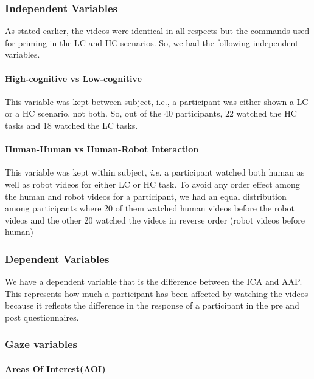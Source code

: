 \documentclass{acm_proc_article-sp}
\begin{document}
\subsubsection{Independent Variables}

As stated earlier, the videos were identical in all respects but the commands
used for priming in the LC and HC scenarios. So, we had the following
independent variables.

\paragraph{High-cognitive vs Low-cognitive}

This variable was kept between subject, i.e., a participant was either shown a
LC or a HC scenario, not both. So, out of the 40 participants, 22 watched the HC
tasks and 18 watched the LC tasks.

\paragraph{Human-Human vs Human-Robot Interaction}

This variable was kept within subject, \textit{i.e.} a participant watched both
human as well as robot videos for either LC or HC task. To avoid any order
effect among the human and robot videos for a participant, we had an equal
distribution among participants where 20 of them watched human videos before the
robot videos and the other 20 watched the videos in reverse order (robot videos
before human) 

\subsubsection{Dependent Variables}

We have a dependent variable that is the difference between the ICA and AAP.
This represents how much a participant has been affected by watching the videos
because it reflects the difference in the response of a participant in the pre
and post questionnaires.

\subsubsection{Gaze variables}

\paragraph{Areas Of Interest(AOI)}
\end{document}
